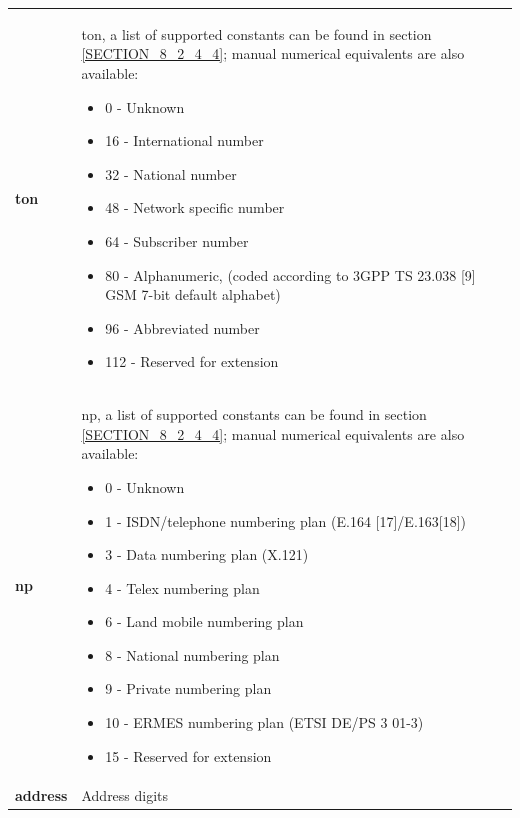 \documentclass[a4paper,latin]{paper}
\begin{document}
\begin{tabularx}{\textwidth}{ | l | X |}
	\textbf{ton}				& \acrfull{ton}, a list of supported constants can be found in
                                                  section \ref{SECTION_8_2_4_4}; manual numerical equivalents are also available: 
	  					  \begin{itemize}
						  	\setlength{\itemsep}{0pt}
							\setlength{\parskip}{0pt}
							\setlength{\parsep}{0pt}
							\item 0 - Unknown
							\item 16 - International number
							\item 32 - National number
							\item 48 - Network specific number
							\item 64 - Subscriber number
							\item 80 - Alphanumeric, (coded according to 3GPP TS 23.038 [9] GSM 7-bit default alphabet)
							\item 96 - Abbreviated number
							\item 112 - Reserved for extension
						    \end{itemize} \\ 
	\textbf{np}				& \acrfull{np}, a list of supported constants can be found in
                                                  section \ref{SECTION_8_2_4_4}; manual numerical equivalents are also available: 
	  					  \begin{itemize}
						  	\setlength{\itemsep}{0pt}
							\setlength{\parskip}{0pt}
							\setlength{\parsep}{0pt}
							\item 0 - Unknown
							\item 1 - ISDN/telephone numbering plan (E.164 [17]/E.163[18])
							\item 3 - Data numbering plan (X.121)
							\item 4 - Telex numbering plan
							\item 6 - Land mobile numbering plan
							\item 8 - National numbering plan
							\item 9 - Private numbering plan
							\item 10 - ERMES numbering plan (ETSI DE/PS 3 01-3)
							\item 15 - Reserved for extension
						    \end{itemize} \\ 
	\textbf{address}			& Address digits \\

	\hline
\end{tabularx}
\clearpage
\end{document}
